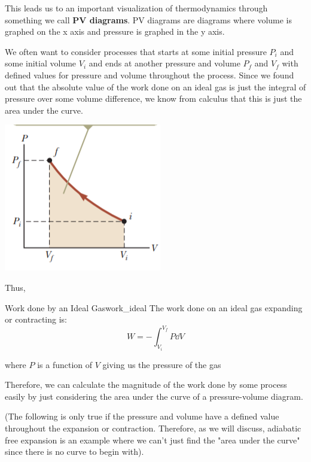 \documentclass{report}
\begin{document}
This leads us to an important visualization of thermodynamics through something we call \textbf{PV diagrams}. PV diagrams are diagrams where volume is graphed on the x axis and pressure is graphed in the y axis. 

We often want to consider processes that starts at some initial pressure $P_i$ and some initial volume $V_i$ and ends at another pressure and volume $P_f$ and $V_f$ with defined values for pressure and volume throughout the process. Since we found out that the absolute value of the work done on an ideal gas is just the integral of pressure over some volume difference, we know from calculus that this is just the area under the curve.

\begin{center}
    \includegraphics[scale=0.9]{pv_work.PNG}
\end{center}

Thus,

\begin{mytheo}{Work done by an Ideal Gas}{work_ideal}
    The work done  on an ideal gas expanding or contracting is:
    $$W = -\int_{V_i}^{V_f} P \dd V$$
    
    where $P$ is a function of $V$ giving us the pressure of the gas
    
    Therefore, we can calculate the magnitude of the work done by some process easily by just considering the area under the curve of a pressure-volume diagram.
    
    (The following is only true if the pressure and volume have a defined value throughout the expansion or contraction. Therefore, as we will discuss, adiabatic free expansion is an example where we can't just find the "area under the curve" since there is no curve to begin with).
    
\end{mytheo}
\end{document}
